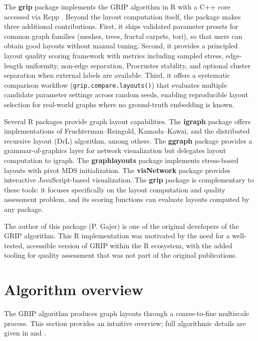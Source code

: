 The \textbf{grip} package implements the GRIP algorithm in R with a C++ core
accessed via Rcpp \citep{eddelbuettel2011}. Beyond the layout computation itself,
the package makes three additional contributions. First, it ships validated
parameter presets for common graph families (meshes, trees, fractal carpets,
tori), so that users can obtain good layouts without manual tuning. Second, it
provides a principled layout quality scoring framework with metrics including
sampled stress, edge-length uniformity, non-edge separation, Procrustes
stability, and optional cluster separation when external labels are available.
Third, it offers a systematic comparison workflow
(\texttt{grip.compare.layouts()}) that evaluates multiple candidate
parameter settings across random seeds, enabling reproducible layout selection
for real-world graphs where no ground-truth embedding is known.

Several R packages provide graph layout capabilities. The \textbf{igraph} package
\citep{csardi2006} offers implementations of Fruchterman--Reingold,
Kamada--Kawai, and the distributed recursive layout (DrL) algorithm, among
others. The \textbf{ggraph} package \citep{pedersen2024} provides a grammar-of-graphics
layer for network visualization but delegates layout computation to igraph. The
\textbf{graphlayouts} package \citep{schoch2024} implements stress-based layouts with
pivot MDS initialization. The \textbf{visNetwork} package provides interactive
JavaScript-based visualization. The \textbf{grip} package is complementary to these
tools: it focuses specifically on the layout computation and quality assessment
problem, and its scoring functions can evaluate layouts computed by any package.

The author of this package (P. Gajer) is one of the original developers of the
GRIP algorithm. This R implementation was motivated by the need for a
well-tested, accessible version of GRIP within the R ecosystem, with the
added tooling for quality assessment that was not part of the original
publications.

\section{Algorithm overview}\label{algorithm-overview}

The GRIP algorithm produces graph layouts through a coarse-to-fine multiscale
process. This section provides an intuitive overview; full algorithmic details
are given in \citet{gajer2002} and \citet{gajer2004}.

